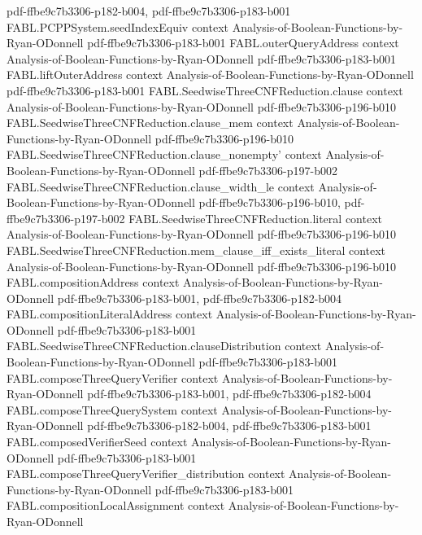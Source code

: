 \begin{theorem}
  {pdf-ffbe9c7b3306-p182-b004,
    pdf-ffbe9c7b3306-p183-b001}
\proofstep
  {FABL.PCPPSystem.seedIndexEquiv}
  {context}
  {Analysis-of-Boolean-Functions-by-Ryan-ODonnell}
  {pdf-ffbe9c7b3306-p183-b001}
\proofstep
  {FABL.outerQueryAddress}
  {context}
  {Analysis-of-Boolean-Functions-by-Ryan-ODonnell}
  {pdf-ffbe9c7b3306-p183-b001}
\proofstep
  {FABL.liftOuterAddress}
  {context}
  {Analysis-of-Boolean-Functions-by-Ryan-ODonnell}
  {pdf-ffbe9c7b3306-p183-b001}
\proofstep
  {FABL.SeedwiseThreeCNFReduction.clause}
  {context}
  {Analysis-of-Boolean-Functions-by-Ryan-ODonnell}
  {pdf-ffbe9c7b3306-p196-b010}
\proofstep
  {FABL.SeedwiseThreeCNFReduction.clause_mem}
  {context}
  {Analysis-of-Boolean-Functions-by-Ryan-ODonnell}
  {pdf-ffbe9c7b3306-p196-b010}
\proofstep
  {FABL.SeedwiseThreeCNFReduction.clause_nonempty'}
  {context}
  {Analysis-of-Boolean-Functions-by-Ryan-ODonnell}
  {pdf-ffbe9c7b3306-p197-b002}
\proofstep
  {FABL.SeedwiseThreeCNFReduction.clause_width_le}
  {context}
  {Analysis-of-Boolean-Functions-by-Ryan-ODonnell}
  {pdf-ffbe9c7b3306-p196-b010,
    pdf-ffbe9c7b3306-p197-b002}
\proofstep
  {FABL.SeedwiseThreeCNFReduction.literal}
  {context}
  {Analysis-of-Boolean-Functions-by-Ryan-ODonnell}
  {pdf-ffbe9c7b3306-p196-b010}
\proofstep
  {FABL.SeedwiseThreeCNFReduction.mem_clause_iff_exists_literal}
  {context}
  {Analysis-of-Boolean-Functions-by-Ryan-ODonnell}
  {pdf-ffbe9c7b3306-p196-b010}
\proofstep
  {FABL.compositionAddress}
  {context}
  {Analysis-of-Boolean-Functions-by-Ryan-ODonnell}
  {pdf-ffbe9c7b3306-p183-b001,
    pdf-ffbe9c7b3306-p182-b004}
\proofstep
  {FABL.compositionLiteralAddress}
  {context}
  {Analysis-of-Boolean-Functions-by-Ryan-ODonnell}
  {pdf-ffbe9c7b3306-p183-b001}
\proofstep
  {FABL.SeedwiseThreeCNFReduction.clauseDistribution}
  {context}
  {Analysis-of-Boolean-Functions-by-Ryan-ODonnell}
  {pdf-ffbe9c7b3306-p183-b001}
\proofstep
  {FABL.composeThreeQueryVerifier}
  {context}
  {Analysis-of-Boolean-Functions-by-Ryan-ODonnell}
  {pdf-ffbe9c7b3306-p183-b001,
    pdf-ffbe9c7b3306-p182-b004}
\proofstep
  {FABL.composeThreeQuerySystem}
  {context}
  {Analysis-of-Boolean-Functions-by-Ryan-ODonnell}
  {pdf-ffbe9c7b3306-p182-b004,
    pdf-ffbe9c7b3306-p183-b001}
\proofstep
  {FABL.composedVerifierSeed}
  {context}
  {Analysis-of-Boolean-Functions-by-Ryan-ODonnell}
  {pdf-ffbe9c7b3306-p183-b001}
\proofstep
  {FABL.composeThreeQueryVerifier_distribution}
  {context}
  {Analysis-of-Boolean-Functions-by-Ryan-ODonnell}
  {pdf-ffbe9c7b3306-p183-b001}
\proofstep
  {FABL.compositionLocalAssignment}
  {context}
  {Analysis-of-Boolean-Functions-by-Ryan-ODonnell}

\end{theorem}
